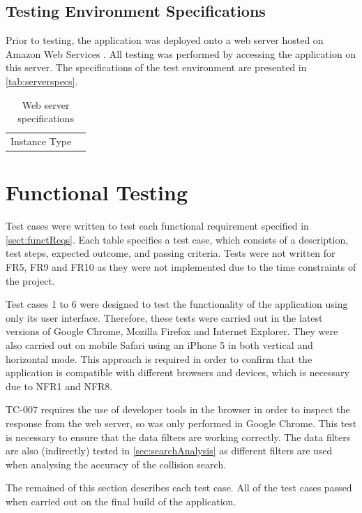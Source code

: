 \documentclass[authoryearcitations]{UoYCSproject}
\begin{document}
\subsection{Testing Environment Specifications}

Prior to testing, the application was deployed onto a web server hosted on Amazon Web Services \citep{AmazonWebServices}. All testing was performed by accessing the application on this server. The specifications of the test environment are presented in \autoref{tab:serverspecs}.

\begin{table}
	\caption{Web server specifications}
	\label{tab:serverspecs}
	\begin{tabular}{| l | l |}
	\hline
	Instance Type
	\end{tabular}
\end{table}

\section{Functional Testing}

Test cases were written to test each functional requirement specified in \autoref{sect:functReqs}. Each table specifies a test case, which consists of a description, test steps, expected outcome, and passing criteria. Tests were not written for FR5, FR9 and FR10 as they were not implemented due to the time constraints of the project.

Test cases 1 to 6 were designed to test the functionality of the application using only its user interface. Therefore, these tests were carried out in the latest versions of Google Chrome, Mozilla Firefox and Internet Explorer. They were also carried out on mobile Safari using an iPhone 5 in both vertical and horizontal mode. This approach is required in order to confirm that the application is compatible with different browsers and devices, which is necessary due to NFR1 and NFR8.

TC-007 requires the use of developer tools in the browser in order to inspect the response from the web server, so was only performed in Google Chrome. This test is necessary to ensure that the data filters are working correctly. The data filters are also (indirectly) tested in \autoref{sec:searchAnalysis} as different filters are used when analysing the accuracy of the collision search.

The remained of this section describes each test case. All of the test cases passed when carried out on the final build of the application.
\end{document}
